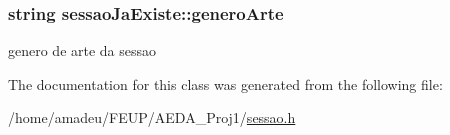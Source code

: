 \subsubsection[{\texorpdfstring{genero\+Arte}{generoArte}}]{\setlength{\rightskip}{0pt plus 5cm}string sessao\+Ja\+Existe\+::genero\+Arte}\hypertarget{classsessaoJaExiste_a9f0e4f38a0f1cebabdb28aa888e29dd2}{}\label{classsessaoJaExiste_a9f0e4f38a0f1cebabdb28aa888e29dd2}


genero de arte da sessao 



The documentation for this class was generated from the following file\+:\begin{DoxyCompactItemize}
\item 
/home/amadeu/\+F\+E\+U\+P/\+A\+E\+D\+A\+\_\+\+Proj1/\hyperlink{sessao_8h}{sessao.\+h}\end{DoxyCompactItemize}

